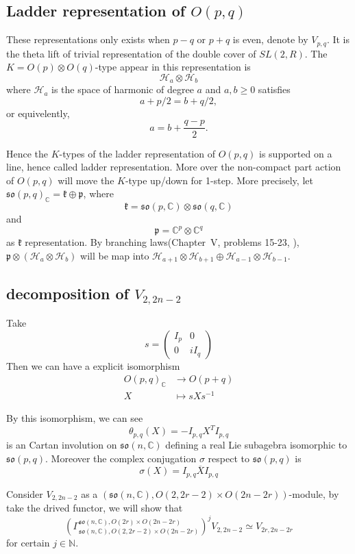 \documentclass[12pt]{article}
\def\bN{{\mathbb{N}}}
\def\bC{{\mathbb{C}}}
\def\aso{\mathfrak{so}}
\def\fpp{\mathfrak{p}}
\def\fkk{\mathfrak{k}}
\def\chh{\mathcal{H}}
\begin{document}
\subsection{Ladder representation of $O(p,q)$}
These representations only exists when $p-q$ or $p+q$ is even, denote by 
$V_{p,q}$.
It is the theta lift of trivial representation of the double cover of $SL(2,R)$.
The $K=O(p)\otimes O(q)$-type appear in this representation is 
\[
\chh_a\otimes \chh_b
\]
where $\chh_a$ is the space of harmonic of degree $a$ and $a,b \geq 0$
satisfies
\[
a+p/2 = b+q/2,
\]
or equivelently, 
\[
a = b + \frac{q-p}{2}.
\]

Hence the $K$-types of the ladder representation of $O(p,q)$ is supported on 
a line, hence called ladder representation. More over 
the non-compact part action of $O(p,q)$ will move the $K$-type up/down 
for 1-step. More precisely, let $\aso(p,q)_\bC = \fkk\oplus \fpp$, where
\[
\fkk = \aso(p,\bC) \otimes \aso(q,\bC)
\]
and
\[
\fpp = \bC^p\otimes \bC^q
\]
as $\fkk$ representation. 
By branching laws(Chapter~V, problems 15-23\cite{Knapp1996Lie},\cite{KimLee2010} ), $\fpp\otimes (\chh_a\otimes \chh_b) $ will be map into $\chh_{a+1}\otimes\chh_{b+1}\oplus \chh_{a-1}\otimes \chh_{b-1}$. 

\subsection{decomposition of $V_{2,2n-2}$}
Take 
\[
s = \begin{pmatrix}
  I_p & 0 \\
  0 & iI_q
\end{pmatrix}
\]
Then we can have a explicit isomorphism 
\[
\begin{split}
O(p,q)_\bC &\to O(p+q)\\
X &\mapsto sXs^{-1}
\end{split}
\]

By this isomorphism, we can see
\[
\theta_{p,q}(X)=-I_{p,q}X^T I_{p,q}
\]
 is an Cartan involution on $\aso(n,\bC)$ defining a real 
Lie subagebra isomorphic to $\aso(p,q)$. 
Moreover the complex conjugation $\sigma$ respect to $\aso(p,q)$ is 
\[
\sigma(X) = I_{p,q}\overline{X}I_{p,q}
\] 

Consider $V_{2,2n-2}$ as a $(\aso(n,\bC), O(2,2r-2)\times O(2n-2r))$-module,
by take the drived functor, we will show that 
\[
\left(\Gamma_{\aso(n,\bC), O(2,2r-2)\times O(2n-2r)}^{\aso(n,\bC), O(2r)\times O(2n-2r)}\right)^j
V_{2,2n-2} \simeq V_{2r,2n-2r}
\]
for certain $j\in \bN$.
\end{document}
